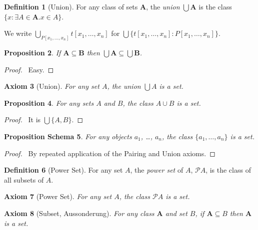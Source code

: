 \documentclass{article}
\let\qed\relax
\newtheorem{axiom}{Axiom}
\newtheorem{proposition}[axiom]{Proposition}
\newtheorem{props}[axiom]{Proposition Schema}
\theoremstyle{definition}
\newtheorem{definition}[axiom]{Definition}
\begin{document}
    \begin{definition}[Union]
        For any class of sets $\mathbf{A}$, the \emph{union} $\bigcup \mathbf{A}$ is the class
        $\{ x : \exists A \in \mathbf{A}. x \in A \}$.

        We write $\bigcup_{P[x_1, \ldots, x_n]} t[x_1, \ldots, x_n]$ for $\bigcup \{ t[x_1, \ldots, x_n]
        : P[x_1, \ldots, x_n] \}$.
    \end{definition}

    \begin{proposition}
        If $\mathbf{A} \subseteq \mathbf{B}$ then $\bigcup \mathbf{A} \subseteq \bigcup \mathbf{B}$.
    \end{proposition}

    \begin{proof}
        \pf\ Easy. \qed
    \end{proof}

    \begin{axiom}[Union]
        For any set $A$, the union $\bigcup A$ is a set.
    \end{axiom}

    \begin{proposition}
        For any sets $A$ and $B$, the class $A \cup B$ is a set.
    \end{proposition}

    \begin{proof}
        \pf\ It is $\bigcup \{ A, B \}$. \qed
    \end{proof}

    \begin{props}
        For any objects $a_1$, \ldots, $a_n$, the class $\{ a_1, \ldots, a_n \}$ is a set.
    \end{props}

    \begin{proof}
        \pf\ By repeated application of the Pairing and Union axioms. \qed
    \end{proof}

    \begin{definition}[Power Set]
        For any set $A$, the \emph{power set} of $A$, $\mathcal{P} A$, is the class of all subsets of $A$.
    \end{definition}

    \begin{axiom}[Power Set]
        For any set $A$, the class $\mathcal{P} A$ is a set.
    \end{axiom}

    \begin{axiom}[Subset, Aussonderung]
        For any class $\mathbf{A}$ and set $B$, if $\mathbf{A} \subseteq B$ then $\mathbf{A}$ is a set.
    \end{axiom}
\end{document}

